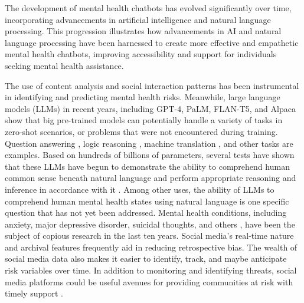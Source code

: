 The development of mental health chatbots has evolved significantly over time, incorporating advancements in artificial intelligence and natural language processing. This progression illustrates how advancements in AI and natural language processing have been harnessed to create more effective and empathetic mental health chatbots, improving accessibility and support for individuals seeking mental health assistance.

The use of content analysis and social interaction patterns has been instrumental in identifying and predicting mental health risks. Meanwhile, large language models (LLMs) in recent years, including GPT-4, PaLM, FLAN-T5, and Alpaca show that big pre-trained models can potentially handle a variety of tasks in zero-shot scenarios, or problems that were not encountered during training. Question answering \cite{omar2023chatgpt}, logic reasoning \cite{wei2022finetuned}, machine translation \cite{brants2007large}, and other tasks are examples. Based on hundreds of billions of parameters, several tests have shown that these LLMs have begun to demonstrate the ability to comprehend human common sense beneath natural language and perform appropriate reasoning and inference in accordance with it \cite{bubeck2023sparks}. Among other uses, the ability of LLMs to comprehend human mental health states using natural language is one specific question that has not yet been addressed. Mental health conditions, including anxiety, major depressive disorder, suicidal thoughts, and others \cite{coppersmith2015adhd}, have been the subject of copious research in the last ten years. Social media's real-time nature and archival features frequently aid in reducing retrospective bias. The wealth of social media data also makes it easier to identify, track, and maybe anticipate risk variables over time. In addition to monitoring and identifying threats, social media platforms could be useful avenues for providing communities at risk with timely support \cite{kruzan2022social}.

